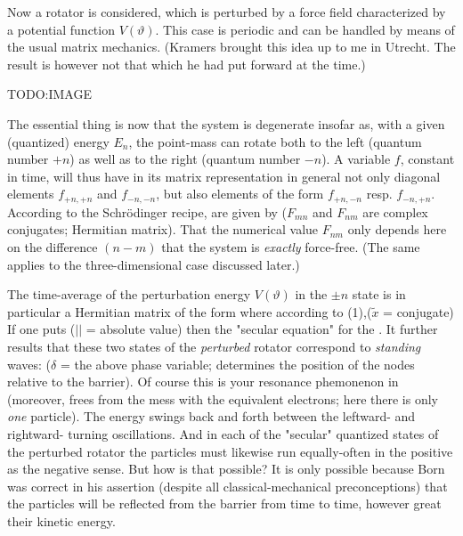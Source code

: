 Now a rotator is considered, which is perturbed  by a force field characterized by a potential function $V(\vartheta)$. This case is periodic and can be handled by means of the usual matrix mechanics.  (Kramers brought this idea up to me in Utrecht. The result is however not that which he had put forward at the time.)


TODO:IMAGE

The essential thing is now that the system is degenerate insofar as, with a given (quantized) energy $E_n$, the point-mass can rotate both to the left (quantum number $+n$) as well as to the right (quantum number $-n$). A variable $f$, constant in time, will thus have in its matrix representation in general not only diagonal elements $f_{+n,+n}$ and $f_{-n,-n}$, but also elements of the form $f_{+n,-n}$ resp. $f_{-n,+n}$. According to the Schr\"odinger recipe,  are given by
($F_{mn}$ and $F_{nm}$ are complex conjugates; Hermitian matrix). That the numerical value $F_{nm}$ only depends here on the difference $(n-m)$  that the system is \textit{exactly} force-free. (The same applies to the three-dimensional case discussed later.)

The time-average of the perturbation energy $V(\vartheta)$ in the $\pm n$ state is in particular a Hermitian matrix of the form
where according to (1),($\widetilde{x}$ = conjugate)
If one puts ($||$ = absolute value)
then the "secular equation" for the 
. It further results that these two states of the \textit{perturbed} rotator correspond to \textit{standing} waves:
($\delta$ = the above phase variable; determines the position of the nodes relative to the barrier). Of course this is your  resonance phemonenon in  (moreover, frees from the mess with the equivalent electrons; here there is only \textit{one} particle). The energy swings back and forth between the leftward- and rightward- turning oscillations. And in each of the "secular" quantized states of the perturbed rotator the particles must likewise run equally-often in the positive as the negative sense. But how is that possible? It is only possible because Born was correct in his assertion (despite all classical-mechanical preconceptions) that the particles will be reflected from the barrier from time to time, however great their kinetic energy.

